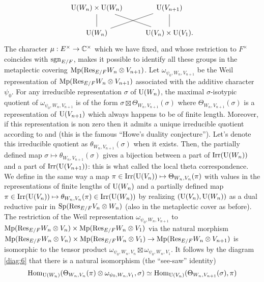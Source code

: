 \begin{equation}
\label{diag:6}
\begin{tikzcd}
    \rU(W_n) \times \rU(W_n) \arrow[d, dash] \arrow[dr, dash] & \rU(V_{n+1}) \arrow[d, dash] \arrow[dl, dash]\\
    \rU(W_n) & \rU(V_n) \times \rU(V_1).
\end{tikzcd}
\end{equation}
The character $\mu: E^\times \to \mathbb{C}^\times$ which we have fixed, and whose restriction to $F^\times$ coincides with $\mathrm{sgn}_{E/F}$, makes it possible to identify all these groups in the metaplectic covering $\mathrm{Mp}(\mathrm{Res}_{E/F} W_n \otimes V_{n+1})$.
Let $\omega_{\psi_0, W_n, V_{n+1}}$ be the Weil representation of $\mathrm{Mp}(\mathrm{Res}_{E/F} W_n \otimes V_{n+1})$ associated with the additive character $\psi_0$.
For any irreducible representation $\sigma$ of $\mathrm{U}(W_n)$, the maximal $\sigma$-isotypic quotient of $\omega_{\psi_0, W_n, V_{n+1}}$ is of the form $\sigma \boxtimes \Theta_{W_n, V_{n+1}}(\sigma)$ where $\Theta_{W_n, V_{n+1}}(\sigma)$ is a representation of $\mathrm{U}(V_{n+1})$ which always happens to be of finite length.
Moreover, if this representation is non zero then it admits a unique irreducible quotient according to \cite{waldspurger1990demonstration} and \cite{gan2016howe} (this is the famous “Howe's duality conjecture”).
Let's denote this irreducible quotient as $\theta_{W_n, V_{n+1}}(\sigma)$ when it exists.
Then, the partially defined map $\sigma \mapsto \theta_{W_n, V_{n+1}}(\sigma)$ gives a bijection between a part of $\mathrm{Irr}(\mathrm{U}(W_n))$ and a part of $\mathrm{Irr}(\mathrm{U}(V_{n+1}))$: this is what called the local theta correspondence.
We define in the same way a map $\pi \in\mathrm{Irr}(\mathrm{U}(V_n)) \mapsto \Theta_{W_n, V_{n}}(\pi)$ with values in the representations of finite lengths of $\mathrm{U}(W_n)$ and a partially defined map $\pi \in \mathrm{Irr}(\mathrm{U}(V_n)) \mapsto \theta_{W_n, V_n}(\pi) \in \mathrm{Irr}(\mathrm{U}(W_n))$ by realizing $(\mathrm{U}(V_n), \mathrm{U}(W_n))$ as a dual reductive pair in $\mathrm{Sp}(\mathrm{Res}_{E/F} V_n \otimes W_n)$ (also in the metaplectic cover as before).
The restriction of the Weil representation $\omega_{\psi_0, W_n, V_{n+1}}$ to $\mathrm{Mp}(\mathrm{Res}_{E/F}W_n \otimes V_n) \times \mathrm{Mp}(\mathrm{Res}_{E/F} W_n \otimes V_1)$ via the natural morphism $\mathrm{Mp}(\mathrm{Res}_{E/F} W_n \otimes V_n) \times \mathrm{Mp}(\mathrm{Res}_{E/F} W_n \otimes V_1) \to \mathrm{Mp}(\mathrm{Res}_{E/F} W_n \otimes V_{n+1})$ is isomorphic to the tensor product $\omega_{\psi_0, W_n, V_n} \boxtimes \omega_{\psi_0, W_n, V_1}$.
It follows by the diagram \eqref{diag:6} that there is a natural isomorphism (the ``see-saw'' identity)
\begin{equation}
    \label{eqn:7}
    \mathrm{Hom}_{\mathrm{U}(W_n)}(\Theta_{W_n, V_n}(\pi) \otimes \omega_{\psi_0, W_n, V_1}, \sigma) \simeq \mathrm{Hom}_{\mathrm{U}(V_n)}(\Theta_{W_n, V_{n+1}}(\sigma), \pi)
\end{equation}
